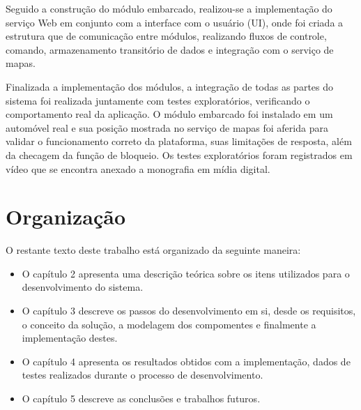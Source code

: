 Seguido a construção do módulo embarcado, realizou-se a implementação do serviço Web em conjunto com a interface com o usuário (UI), onde foi criada a estrutura que de comunicação entre módulos, realizando fluxos de controle, comando, armazenamento transitório de dados e integração com o serviço de mapas.  

Finalizada a implementação dos módulos, a integração de todas as partes do sistema foi realizada juntamente com testes exploratórios, verificando o comportamento real da aplicação. O módulo embarcado foi instalado em um automóvel real e sua posição mostrada no serviço de mapas foi aferida para validar o funcionamento correto da plataforma, suas limitações de resposta, além da checagem da função de bloqueio. Os testes exploratórios foram registrados em vídeo que se encontra anexado a monografia em mídia digital.

\section{Organiza\c{c}\~{a}o}

O restante texto deste trabalho está organizado da seguinte maneira:

\begin{itemize}
	\item O capítulo 2 apresenta uma descrição teórica sobre os itens utilizados para o desenvolvimento do sistema.
	\item O capítulo 3 descreve os passos do desenvolvimento em si, desde os requisitos, o conceito da solução, a modelagem dos compomentes e finalmente a implementação destes.
	\item O capítulo 4 apresenta os resultados obtidos com a implementação, dados de testes realizados durante o processo de desenvolvimento.
	\item O capítulo 5 descreve as conclusões e trabalhos futuros.
	
\end{itemize}